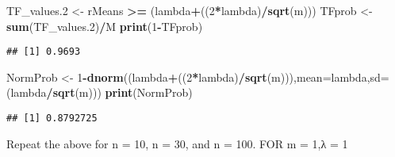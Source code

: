 \documentclass[
]{article}
\newenvironment{Shaded}{\begin{snugshade}}{\end{snugshade}}
\newcommand{\DataTypeTok}[1]{\textcolor[rgb]{0.13,0.29,0.53}{#1}}
\newcommand{\DecValTok}[1]{\textcolor[rgb]{0.00,0.00,0.81}{#1}}
\newcommand{\FloatTok}[1]{\textcolor[rgb]{0.00,0.00,0.81}{#1}}
\newcommand{\KeywordTok}[1]{\textcolor[rgb]{0.13,0.29,0.53}{\textbf{#1}}}
\newcommand{\NormalTok}[1]{#1}
\newcommand{\OperatorTok}[1]{\textcolor[rgb]{0.81,0.36,0.00}{\textbf{#1}}}
\newcommand{\StringTok}[1]{\textcolor[rgb]{0.31,0.60,0.02}{#1}}
\begin{document}
\begin{Shaded}
\begin{Highlighting}[]
\NormalTok{TF_values}\FloatTok{.2}\NormalTok{ <-}\StringTok{ }\NormalTok{rMeans }\OperatorTok{>=}\StringTok{ }\NormalTok{(lambda}\OperatorTok{+}\NormalTok{((}\DecValTok{2}\OperatorTok{*}\NormalTok{lambda)}\OperatorTok{/}\KeywordTok{sqrt}\NormalTok{(m)))}
\NormalTok{TFprob <-}\StringTok{ }\KeywordTok{sum}\NormalTok{(TF_values}\FloatTok{.2}\NormalTok{)}\OperatorTok{/}\NormalTok{M}
\KeywordTok{print}\NormalTok{(}\DecValTok{1}\OperatorTok{-}\NormalTok{TFprob)}
\end{Highlighting}
\end{Shaded}

\begin{verbatim}
## [1] 0.9693
\end{verbatim}

\begin{Shaded}
\begin{Highlighting}[]
\NormalTok{NormProb <-}\StringTok{ }\DecValTok{1}\OperatorTok{-}\KeywordTok{dnorm}\NormalTok{((lambda}\OperatorTok{+}\NormalTok{((}\DecValTok{2}\OperatorTok{*}\NormalTok{lambda)}\OperatorTok{/}\KeywordTok{sqrt}\NormalTok{(m))),}\DataTypeTok{mean=}\NormalTok{lambda,}\DataTypeTok{sd=}\NormalTok{(lambda}\OperatorTok{/}\KeywordTok{sqrt}\NormalTok{(m)))}
\KeywordTok{print}\NormalTok{(NormProb)}
\end{Highlighting}
\end{Shaded}

\begin{verbatim}
## [1] 0.8792725
\end{verbatim}

Repeat the above for n = 10, n = 30, and n = 100. FOR m = 1,λ = 1
\end{document}
